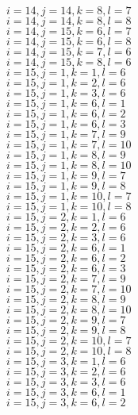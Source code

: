 \documentclass[14pt]{article}
\begin{document}
    $i=14,j=14,k=8,l=7 $ \\ 
    $i=14,j=14,k=8,l=8 $ \\ 
    $i=14,j=15,k=6,l=7 $ \\ 
    $i=14,j=15,k=6,l=8 $ \\ 
    $i=14,j=15,k=7,l=6 $ \\ 
    $i=14,j=15,k=8,l=6 $ \\ 
    $i=15,j=1,k=1,l=6 $ \\ 
    $i=15,j=1,k=2,l=6 $ \\ 
    $i=15,j=1,k=3,l=6 $ \\ 
    $i=15,j=1,k=6,l=1 $ \\ 
    $i=15,j=1,k=6,l=2 $ \\ 
    $i=15,j=1,k=6,l=3 $ \\ 
    $i=15,j=1,k=7,l=9 $ \\ 
    $i=15,j=1,k=7,l=10 $ \\ 
    $i=15,j=1,k=8,l=9 $ \\ 
    $i=15,j=1,k=8,l=10 $ \\ 
    $i=15,j=1,k=9,l=7 $ \\ 
    $i=15,j=1,k=9,l=8 $ \\ 
    $i=15,j=1,k=10,l=7 $ \\ 
    $i=15,j=1,k=10,l=8 $ \\ 
    $i=15,j=2,k=1,l=6 $ \\ 
    $i=15,j=2,k=2,l=6 $ \\ 
    $i=15,j=2,k=3,l=6 $ \\ 
    $i=15,j=2,k=6,l=1 $ \\ 
    $i=15,j=2,k=6,l=2 $ \\ 
    $i=15,j=2,k=6,l=3 $ \\ 
    $i=15,j=2,k=7,l=9 $ \\ 
    $i=15,j=2,k=7,l=10 $ \\ 
    $i=15,j=2,k=8,l=9 $ \\ 
    $i=15,j=2,k=8,l=10 $ \\ 
    $i=15,j=2,k=9,l=7 $ \\ 
    $i=15,j=2,k=9,l=8 $ \\ 
    $i=15,j=2,k=10,l=7 $ \\ 
    $i=15,j=2,k=10,l=8 $ \\ 
    $i=15,j=3,k=1,l=6 $ \\ 
    $i=15,j=3,k=2,l=6 $ \\ 
    $i=15,j=3,k=3,l=6 $ \\ 
    $i=15,j=3,k=6,l=1 $ \\ 
    $i=15,j=3,k=6,l=2 $ \\ 
\end{document}
